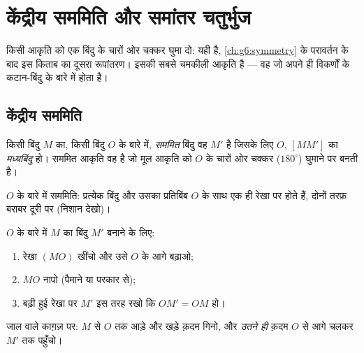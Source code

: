 \chapter{केंद्रीय सममिति और समांतर चतुर्भुज}\label{ch:g7:central}

किसी आकृति को एक बिंदु के चारों ओर  चक्कर घुमा दो: यही
\emph{} है, \cref{ch:g6:symmetry} के परावर्तन के बाद
इस किताब का दूसरा रूपांतरण। इसकी सबसे चमकीली आकृति 
है --- वह  जो अपने ही विकर्णों के कटान-बिंदु के बारे में
 होता है।

\section{केंद्रीय सममिति}

\begin{definition}[किसी बिंदु के बारे में सममित]\label{def:g7:central:def}
किसी बिंदु $M$ का, किसी बिंदु $O$ के बारे में,
\emph{सममित} बिंदु वह $M'$ है जिसके लिए $O$,
$[MM']$ का \emph{मध्यबिंदु} हो। सममित आकृति वह है जो मूल आकृति को
$O$ के चारों ओर  चक्कर ($180^\circ$) घुमाने पर बनती है।
\end{definition}

\begin{omfigure}

{\small $O$ के बारे में सममिति: प्रत्येक बिंदु और उसका प्रतिबिंब
$O$ के साथ एक ही रेखा पर होते हैं, दोनों तरफ़ बराबर दूरी पर (निशान
देखो)।}
\end{omfigure}

\begin{method}[किसी बिंदु का सममित बिंदु बनाना]\label{met:g7:central:construct}
$O$ के बारे में $M$ का  बिंदु $M'$ बनाने के लिए:
\begin{enumerate}
  \item रेखा $(MO)$ खींचो और उसे $O$ के आगे बढ़ाओ;
  \item $MO$ नापो (पैमाने या परकार से);
  \item बढ़ी हुई रेखा पर $M'$ इस तरह रखो कि $OM' = OM$ हो।
\end{enumerate}
जाल वाले काग़ज़ पर: $M$ से $O$ तक आड़े और खड़े क़दम गिनो, और
\emph{उतने ही} क़दम $O$ से आगे चलकर $M'$ तक पहुँचो।
\end{method}

